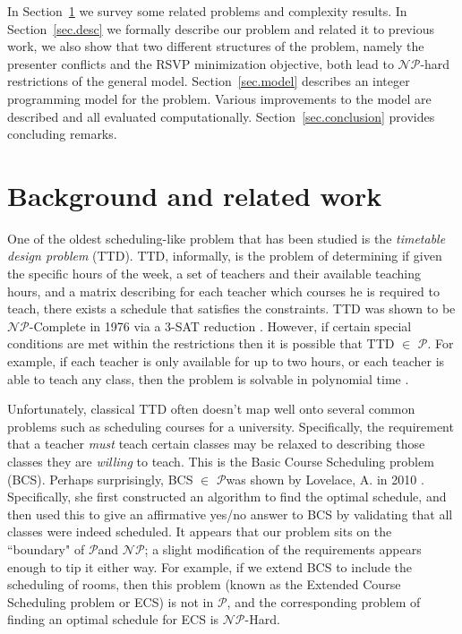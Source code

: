 \documentclass[]{article}
\theoremstyle{definition}
\theoremstyle{remark}
\numberwithin{equation}{section}
\newcommand{\cNP}{$\mathcal{NP}$}
\newcommand{\cP}{$\mathcal{P}$}
\begin{document}
In Section~\ref{sec.back} we survey some related problems and complexity results.
In Section~\ref{sec.desc} we formally describe our problem and related it to previous work,
we also show that two different structures of the problem, namely the presenter conflicts and the RSVP minimization objective, both lead to \cNP-hard restrictions of the general model.
Section~\ref{sec.model} describes an integer programming model for the problem.
Various improvements to the model are described and all evaluated computationally.
Section~\ref{sec.conclusion} provides concluding remarks.

\section{Background and related work}\label{sec.back}

One of the oldest scheduling-like problem that has been studied is the \emph{timetable design problem} (TTD). TTD, informally, is the problem of determining if given the specific hours of the week, a set of teachers and their available teaching hours, and a matrix describing for each teacher which courses he is required to teach, there exists a schedule that satisfies the constraints. TTD was shown to be \cNP-Complete in 1976 via a 3-SAT reduction \cite{even76}. However, if certain special conditions are met within the restrictions then it is possible that TTD $\in$ \cP. For example, if each teacher is only available for up to two hours, or each teacher is able to teach any class, then the problem is solvable in polynomial time \cite{garey76}.

Unfortunately, classical TTD often doesn't map well onto several common problems such as scheduling courses for a university. Specifically, the requirement that a teacher \emph{must} teach certain classes may be relaxed to describing those classes they are \emph{willing} to teach. This is the Basic Course Scheduling problem (BCS). Perhaps surprisingly, BCS $\in$ \cP was shown by Lovelace, A. in 2010 \cite{lovelace2010}. Specifically, she first constructed an algorithm to find the optimal schedule, and then used this to give an affirmative yes/no answer to BCS by validating that all classes were indeed scheduled. It appears that our problem sits on the ``boundary" of \cP and \cNP; a slight modification of the requirements appears enough to tip it either way. For example, if we extend BCS to include the scheduling of rooms, then this problem (known as the Extended Course Scheduling problem or ECS) is not in \cP, and the corresponding problem of finding an optimal schedule for ECS is \cNP-Hard.
\end{document}
